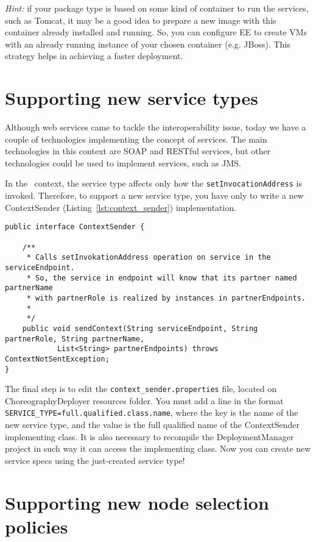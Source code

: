 \emph{Hint:} if your package type is based on some kind of container to run the services,
such as Tomcat, it may be a good idea to prepare a new image with this container already
installed and running. So, you can configure EE to create VMs with an already running
instance of your chosen container (e.g. JBoss).
This strategy helps in achieving a faster deployment.


\section{Supporting new service types}

Although web services came to tackle the interoperability issue, today we have a couple of technologies implementing the concept of services.
The main technologies in this context are SOAP and RESTful services, but other technologies could be used to implement services, such as JMS.

In the \ee\ context, the service type affects only how the \texttt{setInvocationAddress} is invoked.
Therefore, to support a new service type, you have only to write a new \textsf{ContextSender} (Listing~\ref{lst:context_sender}) implementation.

{\footnotesize
\begin{lstlisting}[caption=\textsf{ContextSender} interface, label=lst:context_sender]
public interface ContextSender {

    /**
     * Calls setInvokationAddress operation on service in the serviceEndpoint.
     * So, the service in endpoint will know that its partner named partnerName
     * with partnerRole is realized by instances in partnerEndpoints.
     * 
     */
    public void sendContext(String serviceEndpoint, String partnerRole, String partnerName,
            List<String> partnerEndpoints) throws ContextNotSentException;
}
\end{lstlisting}
}

The final step is to edit the \texttt{context\_sender.properties} file, located on ChoreographyDeployer resources folder. You must add a line in the format \verb!SERVICE_TYPE=full.qualified.class.name!, where the key is the name of the new service type, and the value is the full qualified name of the \textsf{ContextSender} implementing class. It is also necessary to recompile the DeploymentManager project in such way it can access the implementing class. Now you can create new service specs using the just-created service type!

\section{Supporting new node selection policies}

